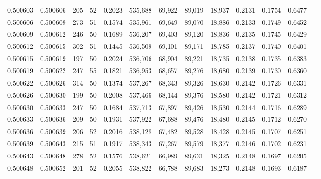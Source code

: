 \begin{tabular}{rrrrrrrrrrrrr}
0.500603 & 0.500606 & 205 &  52 &                                     0.2023 & 535,688 &  69,922 &  89,019 &  18,937 & 0.2131 & 0.1754 & 0.6477 \\
0.500606 & 0.500609 & 273 &  51 &                                     0.1574 & 535,961 &  69,649 &  89,070 &  18,886 & 0.2133 & 0.1749 & 0.6452 \\
0.500609 & 0.500612 & 246 &  50 &                                     0.1689 & 536,207 &  69,403 &  89,120 &  18,836 & 0.2135 & 0.1745 & 0.6429 \\
0.500612 & 0.500615 & 302 &  51 &                                     0.1445 & 536,509 &  69,101 &  89,171 &  18,785 & 0.2137 & 0.1740 & 0.6401 \\
0.500615 & 0.500619 & 197 &  50 &                                     0.2024 & 536,706 &  68,904 &  89,221 &  18,735 & 0.2138 & 0.1735 & 0.6383 \\
0.500619 & 0.500622 & 247 &  55 &                                     0.1821 & 536,953 &  68,657 &  89,276 &  18,680 & 0.2139 & 0.1730 & 0.6360 \\
0.500622 & 0.500626 & 314 &  50 &                                     0.1374 & 537,267 &  68,343 &  89,326 &  18,630 & 0.2142 & 0.1726 & 0.6331 \\
0.500626 & 0.500630 & 199 &  50 &                                     0.2008 & 537,466 &  68,144 &  89,376 &  18,580 & 0.2142 & 0.1721 & 0.6312 \\
0.500630 & 0.500633 & 247 &  50 &                                     0.1684 & 537,713 &  67,897 &  89,426 &  18,530 & 0.2144 & 0.1716 & 0.6289 \\
0.500633 & 0.500636 & 209 &  50 &                                     0.1931 & 537,922 &  67,688 &  89,476 &  18,480 & 0.2145 & 0.1712 & 0.6270 \\
0.500636 & 0.500639 & 206 &  52 &                                     0.2016 & 538,128 &  67,482 &  89,528 &  18,428 & 0.2145 & 0.1707 & 0.6251 \\
0.500639 & 0.500643 & 215 &  51 &                                     0.1917 & 538,343 &  67,267 &  89,579 &  18,377 & 0.2146 & 0.1702 & 0.6231 \\
0.500643 & 0.500648 & 278 &  52 &                                     0.1576 & 538,621 &  66,989 &  89,631 &  18,325 & 0.2148 & 0.1697 & 0.6205 \\
0.500648 & 0.500652 & 201 &  52 &                                     0.2055 & 538,822 &  66,788 &  89,683 &  18,273 & 0.2148 & 0.1693 & 0.6187 \\

\end{tabular}
